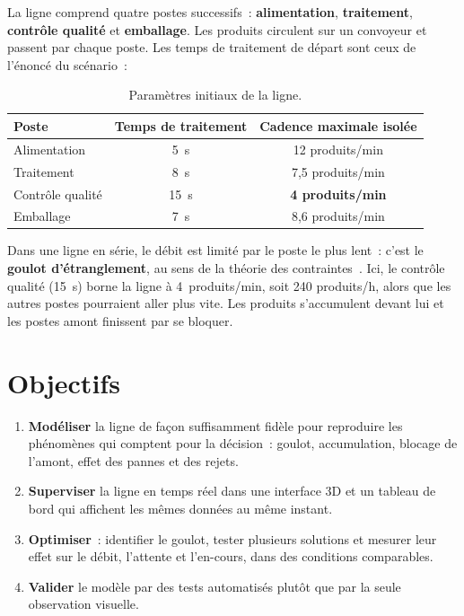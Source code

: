 La ligne comprend quatre postes successifs~: \textbf{alimentation}, \textbf{traitement}, \textbf{contrôle qualité} et \textbf{emballage}. Les produits circulent sur un convoyeur et passent par chaque poste. Les temps de traitement de départ sont ceux de l'énoncé du scénario~:

\begin{table}[H]
\centering
\caption{Paramètres initiaux de la ligne.}
\label{tab:parametres}
\begin{tabular}{@{}lcc@{}}
\toprule
\textbf{Poste} & \textbf{Temps de traitement} & \textbf{Cadence maximale isolée} \\
\midrule
Alimentation & 5~s & 12 produits/min \\
Traitement & 8~s & 7{,}5 produits/min \\
Contrôle qualité & 15~s & \textbf{4 produits/min} \\
Emballage & 7~s & 8{,}6 produits/min \\
\bottomrule
\end{tabular}
\end{table}

Dans une ligne en série, le débit est limité par le poste le plus lent~: c'est le \textbf{goulot d'étranglement}, au sens de la théorie des contraintes~\cite{goldratt1984}. Ici, le contrôle qualité (15~s) borne la ligne à 4~produits/min, soit 240 produits/h, alors que les autres postes pourraient aller plus vite. Les produits s'accumulent devant lui et les postes amont finissent par se bloquer.

\section{Objectifs}

\begin{enumerate}
  \item \textbf{Modéliser} la ligne de façon suffisamment fidèle pour reproduire les phénomènes qui comptent pour la décision~: goulot, accumulation, blocage de l'amont, effet des pannes et des rejets.
  \item \textbf{Superviser} la ligne en temps réel dans une interface \ac{3D} et un tableau de bord qui affichent les mêmes données au même instant.
  \item \textbf{Optimiser}~: identifier le goulot, tester plusieurs solutions et mesurer leur effet sur le débit, l'attente et l'en-cours, dans des conditions comparables.
  \item \textbf{Valider} le modèle par des tests automatisés plutôt que par la seule observation visuelle.
\end{enumerate}
